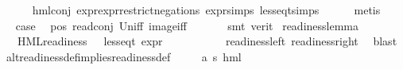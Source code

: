 \begin{isabellebody}
\ \ \ \ \isamarkupfalse%
\ hml{\isacharunderscore}{\kern0pt}conj{\isacharparenleft}{\kern0pt}{}{\isacharparenright}{\kern0pt}\ expr{\isacharunderscore}{\kern0pt}{}{\isacharunderscore}{\kern0pt}expr{\isacharunderscore}{\kern0pt}{}{\isacharunderscore}{\kern0pt}restrict{\isacharunderscore}{\kern0pt}negations\ expr{\isachardot}{\kern0pt}simps\ less{\isacharunderscore}{\kern0pt}eq{\isacharunderscore}{\kern0pt}t{\isachardot}{\kern0pt}simps\isanewline
\ \ \ \ \isamarkupfalse%
\ metis\isanewline
\ \ \isamarkupfalse%
\ \isamarkupfalse%
\ {\isacharquery}{\kern0pt}case\ \isamarkupfalse%
\ pos\ read{\isacharunderscore}{\kern0pt}conj\ Un{\isacharunderscore}{\kern0pt}iff\ image{\isacharunderscore}{\kern0pt}iff\ \isanewline
\ \ \ \ \isamarkupfalse%
\ {\isacharparenleft}{\kern0pt}smt\ {\isacharparenleft}{\kern0pt}verit{\isacharparenright}{\kern0pt}{\isacharparenright}{\kern0pt}\isanewline
{}\isamarkupfalse%
%
\endisatagproof
{\isafoldproof}%
%
\isadelimproof
\isanewline
%
\endisadelimproof
\isanewline
{}\isamarkupfalse%
\ readiness{\isacharunderscore}{\kern0pt}lemma{\isacharcolon}{\kern0pt}\isanewline
\ \ \ {\isachardoublequoteopen}{\isacharparenleft}{\kern0pt}HML{\isacharunderscore}{\kern0pt}readiness\ {\isasymphi}{\isacharparenright}{\kern0pt}\ {\isacharequal}{\kern0pt}\ {\isacharparenleft}{\kern0pt}less{\isacharunderscore}{\kern0pt}eq{\isacharunderscore}{\kern0pt}t\ {\isacharparenleft}{\kern0pt}expr\ {\isasymphi}{\isacharparenright}{\kern0pt}\ {\isacharparenleft}{\kern0pt}{\isasyminfinity}{\isacharcomma}{\kern0pt}\ {}{\isacharcomma}{\kern0pt}\ {}{\isacharcomma}{\kern0pt}\ {}{\isacharcomma}{\kern0pt}\ {}{\isacharcomma}{\kern0pt}\ {}{\isacharparenright}{\kern0pt}{\isacharparenright}{\kern0pt}{\isachardoublequoteclose}\isanewline
%
\isadelimproof
\ \ %
\endisadelimproof
%
\isatagproof
{}\isamarkupfalse%
\ readiness{\isacharunderscore}{\kern0pt}left\ readiness{\isacharunderscore}{\kern0pt}right\ \isamarkupfalse%
\ blast%
\endisatagproof
{\isafoldproof}%
%
\isadelimproof
\isanewline
%
\endisadelimproof
\isanewline
{}\isamarkupfalse%
\ alt{\isacharunderscore}{\kern0pt}readiness{\isacharunderscore}{\kern0pt}def{\isacharunderscore}{\kern0pt}implies{\isacharunderscore}{\kern0pt}readiness{\isacharunderscore}{\kern0pt}def{\isacharcolon}{\kern0pt}\isanewline
\ \ \ {\isasymphi}\ {\isacharcolon}{\kern0pt}{\isacharcolon}{\kern0pt}\ {\isachardoublequoteopen}{\isacharparenleft}{\kern0pt}{\isacharprime}{\kern0pt}a{\isacharcomma}{\kern0pt}\ {\isacharprime}{\kern0pt}s{\isacharparenright}{\kern0pt}\ hml{\isachardoublequoteclose}\isanewline

\end{isabellebody}
